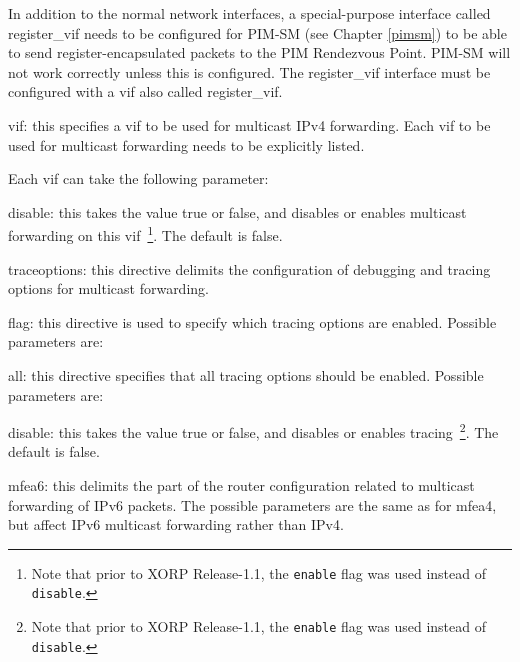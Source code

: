 \begin{description}
\begin{description}
  In addition to the normal network interfaces, a special-purpose
  interface called {\stt register\_vif} needs to be configured for
  PIM-SM (see Chapter \ref{pimsm}) to be able to send
  register-encapsulated packets to the PIM Rendezvous Point.  PIM-SM
  will not work correctly unless this is configured.  The {\stt
  register\_vif} interface must be configured with a vif also called
  {\stt register\_vif}.
\item{\stt vif}: this specifies a vif to be used for multicast IPv4
  forwarding.  Each vif to be used for multicast forwarding needs to
  be explicitly listed.

  Each vif can take the following parameter:
\begin{description}
\item{\stt disable}: this takes the value {\stt true} or {\stt false},
  and disables or enables multicast forwarding on this vif~\footnote{Note
  that prior to XORP Release-1.1, the {\tt enable} flag was used instead of
  {\tt disable}.}.
  The default is {\stt false}.
\end{description}
\end{description}
\item{\stt traceoptions}: this directive delimits the configuration of
  debugging and tracing options for multicast forwarding.
\begin{description}
\item{\stt flag}: this directive is used to specify which tracing
  options are enabled.  Possible parameters are:
\begin{description}
\item{\stt all}: this directive specifies that all tracing
  options should be enabled.  Possible parameters are:
\begin{description}
\item{\stt disable}: this takes the value {\stt true} or {\stt false},
  and disables or enables tracing~\footnote{Note
  that prior to XORP Release-1.1, the {\tt enable} flag was used instead of
  {\tt disable}.}. The default is {\stt false}.
\end{description}
\end{description}
\end{description}
\item{\stt mfea6}: this delimits the part of the router configuration
  related to multicast forwarding of IPv6 packets.  The possible
  parameters are the same as for {\stt mfea4}, but affect IPv6
  multicast forwarding rather than IPv4.
\end{description}


